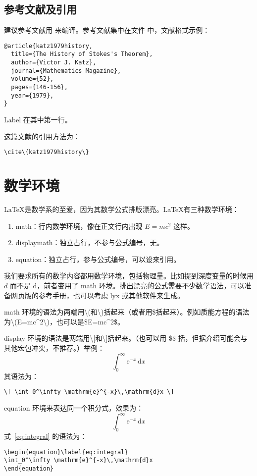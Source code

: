 \subsection{参考文献及引用}
建议参考文献用 来编译。参考文献集中在文件 中，文献格式示例：
\begin{lstlisting}[caption={参考文献格式示例}]
@article{katz1979history,
  title={The History of Stokes's Theorem},
  author={Victor J. Katz},
  journal={Mathematics Magazine},
  volume={52},
  pages={146-156},
  year={1979},
}
\end{lstlisting}
Label 在其中第一行。

这篇文献的引用方法为：
\begin{lstlisting}
\cite\{katz1979history\}
\end{lstlisting}

\section{数学环境}
\LaTeX 是数学系的至爱，因为其数学公式排版漂亮。\LaTeX 有三种数学环境：
\begin{enumerate}
\item math：行内数学环境，像在正文行内出现 $E=mc^2$ 这样。
\item displaymath：独立占行，不参与公式编号，无。
\item equation：独立占行，参与公式编号，可以设来引用。
\end{enumerate}

我们要求所有的数学内容都用数学环境，包括物理量。比如提到深度变量的时候用 $d$ 而不是 d，前者变用了 math 环境。排出漂亮的公式需要不少数学语法，可以准备网页版的参考手册，也可以考虑 lyx 或其他软件来生成。

\begin{paraitem}
\item math 环境的语法为两端用\textbackslash(和\textbackslash)括起来（或者用\$括起来）。例如质能方程的语法为\textbackslash(E=mc\^{}2\textbackslash)，也可以是\$E=mc\^{}2\$。

\item display 环境的语法是两端用\textbackslash[和\textbackslash]括起来。（也可以用 \$\$ 括，但据介绍可能会与其他宏包冲突，不推荐。）举例：\[\int_0^\infty \mathrm{e}^{-x}\,\mathrm{d}x\]
其语法为：
\begin{lstlisting}
\[ \int_0^\infty \mathrm{e}^{-x}\,\mathrm{d}x \]
\end{lstlisting}

\item equation 环境来表达同一个积分式，效果为：
\begin{equation}\label{eq:integral}
\int_0^\infty \mathrm{e}^{-x}\,\mathrm{d}x
\end{equation}
式~\ref{eq:integral} 的语法为：
\begin{lstlisting}
\begin{equation}\label{eq:integral}
\int_0^\infty \mathrm{e}^{-x}\,\mathrm{d}x
\end{equation}
\end{lstlisting}
\end{paraitem}

